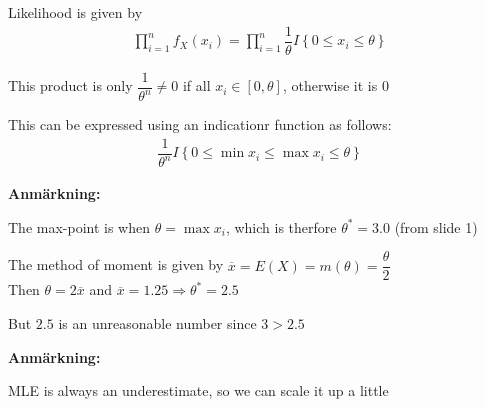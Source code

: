 \par\bigskip
\noindent Likelihood is given by
\begin{equation*}
  \begin{gathered}
    \prod_{i=1}^{n}f_X(x_i) = \prod_{i=1}^{n}\dfrac{1}{\theta}I\left\{0\leq x_i\leq \theta\right\}
  \end{gathered}
\end{equation*}\par
\noindent This product is only $\dfrac{1}{\theta^n}\neq0$ if all $x_i\in [0,\theta]$, otherwise it is 0\par
\noindent This can be expressed using an indicationr function as follows:
\begin{equation*}
  \begin{gathered}
    \dfrac{1}{\theta^n}I\left\{0\leq \min{x_i}\leq\max{x_i}\leq\theta\right\}
  \end{gathered}
\end{equation*}
\par\bigskip
\noindent\textbf{Anmärkning:}\par
\noindent The max-point is when $\theta = \max{x_i}$, which is therfore $\theta^* = 3.0$ (from slide 1)
\par\bigskip
\noindent The method of moment is given by $\overline{x} = E(X) = m(\theta) = \dfrac{\theta}{2}$ \\
\noindent Then $\theta = 2\overline{x}$ and $\overline{x} = 1.25\Rightarrow \theta^* = 2.5$
\par\bigskip
\noindent But $2.5$ is an unreasonable number since $3>2.5$
\par\bigskip
\noindent\textbf{Anmärkning:}\par
\noindent MLE is always an underestimate, so we can scale it up a little
\par\bigskip
